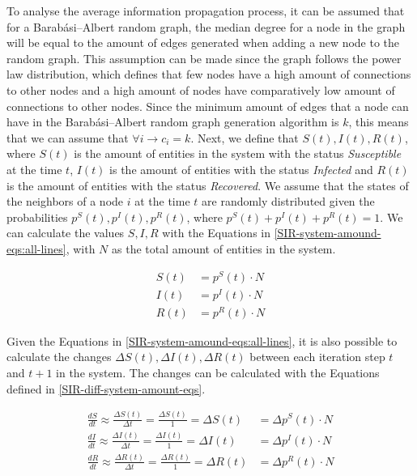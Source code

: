To analyse the average information propagation process, 
it can be assumed that for a Barabási–Albert random graph, 
the median degree for a node in the graph will be equal to the amount 
of edges generated when adding a new node to the random graph.
This assumption can be made since the graph follows the power law distribution,
which defines that few nodes have a high amount of connections to other nodes
and a high amount of nodes have comparatively low amount of connections to 
other nodes. Since the minimum amount of edges that a node can have 
in the Barabási–Albert random graph generation algorithm is $k$, this 
means that we can assume that $\forall i \to c_i=k$.
Next, we define that $S(t), I(t), R(t)$, where $S(t)$ is the amount of
entities in the system with the status \textit{Susceptible} at the time $t$, 
$I(t)$ is the amount of entities with the status \textit{Infected} and
$R(t)$ is the amount of entities with the status \textit{Recovered}. 
We assume that the states of the neighbors of a node $i$ at the time $t$ are 
randomly distributed given the probabilities $p^S(t), p^I(t), p^R(t)$,
where $p^S(t) + p^I(t) + p^R(t) = 1$. We can calculate the values $S, I, R$
with the Equations in \ref{SIR-system-amound-eqs:all-lines},
with $N$ as the total amount of entities in the system.

\begin{subequations}
\begin{align}
    S(t) &=p^S(t)\cdot N \label{SIR-system-amound-eqs:1}\\
    I(t) &=p^I(t)\cdot N \label{SIR-system-amound-eqs:2}\\
    R(t) &=p^R(t)\cdot N \label{SIR-system-amound-eqs:3}
\end{align}
\label{SIR-system-amound-eqs:all-lines}
\end{subequations}

Given the Equations in \ref{SIR-system-amound-eqs:all-lines}, it is also possible 
to calculate the changes $\Delta S(t), \Delta I(t), \Delta R(t)$ between each 
iteration step $t$ and $t+1$ in the system.
The changes can be calculated with the Equations defined in 
\ref{SIR-diff-system-amount-eqs}.

\begin{subequations}
\begin{align}
    \frac{dS}{dt} \approx \frac{\Delta S(t)}{\Delta t} = \frac{\Delta S(t)}{1} = \Delta S(t) &=\Delta p^S(t)\cdot N \label{SIR-diff-system-amount-eqs:1}\\
    \frac{dI}{dt} \approx \frac{\Delta I(t)}{\Delta t} = \frac{\Delta I(t)}{1} = \Delta I(t) &=\Delta p^I(t)\cdot N \label{SIR-diff-system-amount-eqs:2}\\
    \frac{dR}{dt} \approx \frac{\Delta R(t)}{\Delta t} = \frac{\Delta R(t)}{1} = \Delta R(t) &=\Delta p^R(t)\cdot N \label{SIR-diff-system-amount-eqs:3}
\end{align}
\label{SIR-diff-system-amount-eqs}
\end{subequations}


